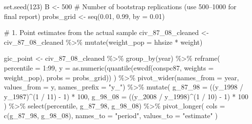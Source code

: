 \documentclass[
  letterpaper,
  DIV=11,
  numbers=noendperiod]{scrartcl}
\newenvironment{Shaded}{\begin{snugshade}}{\end{snugshade}}
\newcommand{\AttributeTok}[1]{\textcolor[rgb]{0.40,0.45,0.13}{#1}}
\newcommand{\CommentTok}[1]{\textcolor[rgb]{0.37,0.37,0.37}{#1}}
\newcommand{\DecValTok}[1]{\textcolor[rgb]{0.68,0.00,0.00}{#1}}
\newcommand{\FloatTok}[1]{\textcolor[rgb]{0.68,0.00,0.00}{#1}}
\newcommand{\FunctionTok}[1]{\textcolor[rgb]{0.28,0.35,0.67}{#1}}
\newcommand{\NormalTok}[1]{\textcolor[rgb]{0.00,0.23,0.31}{#1}}
\newcommand{\OtherTok}[1]{\textcolor[rgb]{0.00,0.23,0.31}{#1}}
\newcommand{\SpecialCharTok}[1]{\textcolor[rgb]{0.37,0.37,0.37}{#1}}
\newcommand{\StringTok}[1]{\textcolor[rgb]{0.13,0.47,0.30}{#1}}
\begin{document}
\begin{Shaded}
\begin{Highlighting}[]
\FunctionTok{set.seed}\NormalTok{(}\DecValTok{123}\NormalTok{)}
\NormalTok{B }\OtherTok{\textless{}{-}} \DecValTok{500} \CommentTok{\# Number of bootstrap replications (use 500–1000 for final report)}
\NormalTok{probs\_grid }\OtherTok{\textless{}{-}} \FunctionTok{seq}\NormalTok{(}\FloatTok{0.01}\NormalTok{, }\FloatTok{0.99}\NormalTok{, }\AttributeTok{by =} \FloatTok{0.01}\NormalTok{)}

\CommentTok{\# 1. Point estimates from the actual sample}
\NormalTok{civ\_87\_08\_cleaned }\OtherTok{\textless{}{-}}\NormalTok{ civ\_87\_08\_cleaned }\SpecialCharTok{\%\textgreater{}\%}
  \FunctionTok{mutate}\NormalTok{(}\AttributeTok{weight\_pop =}\NormalTok{ hhsize }\SpecialCharTok{*}\NormalTok{ weight)}

\NormalTok{gic\_point }\OtherTok{\textless{}{-}}\NormalTok{ civ\_87\_08\_cleaned }\SpecialCharTok{\%\textgreater{}\%}
  \FunctionTok{group\_by}\NormalTok{(year) }\SpecialCharTok{\%\textgreater{}\%}
  \FunctionTok{reframe}\NormalTok{(}
    \AttributeTok{percentile =} \DecValTok{1}\SpecialCharTok{:}\DecValTok{99}\NormalTok{,}
    \AttributeTok{y =} \FunctionTok{as.numeric}\NormalTok{(}\FunctionTok{quantile}\NormalTok{(}\FunctionTok{ewcdf}\NormalTok{(conspc87, }\AttributeTok{weights =}\NormalTok{ weight\_pop), }\AttributeTok{probs =}\NormalTok{ probs\_grid))}
\NormalTok{  ) }\SpecialCharTok{\%\textgreater{}\%}
  \FunctionTok{pivot\_wider}\NormalTok{(}\AttributeTok{names\_from =}\NormalTok{ year, }\AttributeTok{values\_from =}\NormalTok{ y, }\AttributeTok{names\_prefix =} \StringTok{"y\_"}\NormalTok{) }\SpecialCharTok{\%\textgreater{}\%}
  \FunctionTok{mutate}\NormalTok{(}
    \AttributeTok{g\_87\_98 =}\NormalTok{ ((y\_1998 }\SpecialCharTok{/}\NormalTok{ y\_1987)}\SpecialCharTok{\^{}}\NormalTok{(}\DecValTok{1} \SpecialCharTok{/} \DecValTok{11}\NormalTok{) }\SpecialCharTok{{-}} \DecValTok{1}\NormalTok{) }\SpecialCharTok{*} \DecValTok{100}\NormalTok{,}
    \AttributeTok{g\_98\_08 =}\NormalTok{ ((y\_2008 }\SpecialCharTok{/}\NormalTok{ y\_1998)}\SpecialCharTok{\^{}}\NormalTok{(}\DecValTok{1} \SpecialCharTok{/} \DecValTok{10}\NormalTok{) }\SpecialCharTok{{-}} \DecValTok{1}\NormalTok{) }\SpecialCharTok{*} \DecValTok{100}
\NormalTok{  ) }\SpecialCharTok{\%\textgreater{}\%}
  \FunctionTok{select}\NormalTok{(percentile, g\_87\_98, g\_98\_08) }\SpecialCharTok{\%\textgreater{}\%}
  \FunctionTok{pivot\_longer}\NormalTok{(}
    \AttributeTok{cols =} \FunctionTok{c}\NormalTok{(g\_87\_98, g\_98\_08),}
    \AttributeTok{names\_to =} \StringTok{"period"}\NormalTok{,}
    \AttributeTok{values\_to =} \StringTok{"estimate"}
\NormalTok{  )}


\end{Highlighting}
\end{Shaded}
\end{document}
